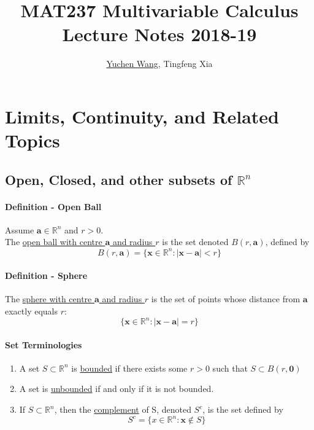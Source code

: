 \documentclass[11pt]{article}
\title{MAT237 Multivariable Calculus \\ Lecture Notes 2018-19}
\author{\textcolor{blue}{\href{https://www.yuchenwyc.com}{Yuchen Wang}}, Tingfeng Xia}
\newcommand{\tb}[1]{\textbf{#1}}
\newcommand{\real}[0]{\mathbb{R}}
\newcommand{\under}[1]{\underline{#1}}
\newcommand{\vx}[0]{\tb{x}}
\newcommand{\vo}[0]{\tb{0}}
\newcommand{\va}[0]{\tb{a}}
\begin{document}
    \maketitle
    \tableofcontents
    \newpage

\section{Limits, Continuity, and Related Topics}
\subsection{Open, Closed, and other subsets of $\real^n$}
\paragraph{Definition - Open Ball}
Assume $\va \in \real^n$ and $r > 0$. \\ The \under{open ball with centre $\va$ and radius $r$} is the set denoted $B(r, \va)$, defined by
$$ B(r, \va) = \{\vx \in \real^n: |\vx - \va| < r \}$$

\paragraph{Definition - Sphere}
The \under{sphere with centre $\va$ and radius $r$} is the set of points whose distance from $\va$ exactly equals $r$:
$$ \{ \vx \in \real^n : |\vx - \va| = r \}$$

\paragraph{Set Terminologies}
\begin{enumerate}
	\item A set $S \subset \real^n$ is \under{bounded} if there exists some $r > 0$ such that $S \subset B(r, \vo)$
	\item A set is \under{unbounded} if and only if it is not bounded.
	\item If $ S \subset \real^n$, then the \under{complement} of S, denoted $S^c$, is the set
	defined by $$ S^c = \{x \in \real^n: \vx \notin S\}$$
\end{enumerate}
\end{document}
